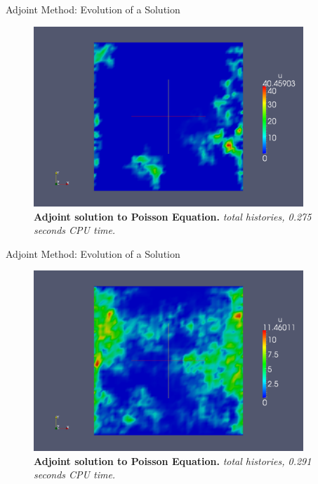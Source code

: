 \documentclass{beamer}
\begin{document}
\begin{frame}{Adjoint Method: Evolution of a Solution}

  \begin{figure}[h!]
    \begin{center}
      \includegraphics[width=4in]{adjoint_100.png}
    \end{center}
    \caption{\textbf{Adjoint solution to Poisson Equation.}
      \textit{ total histories, 0.275 seconds CPU time.} }
  \end{figure}

\end{frame}

\begin{frame}{Adjoint Method: Evolution of a Solution}

  \begin{figure}[h!]
    \begin{center}
      \includegraphics[width=4in]{adjoint_1000.png}
    \end{center}
    \caption{\textbf{Adjoint solution to Poisson Equation.}
      \textit{ total histories, 0.291 seconds CPU time.} }
  \end{figure}

\end{frame}
\end{document}
